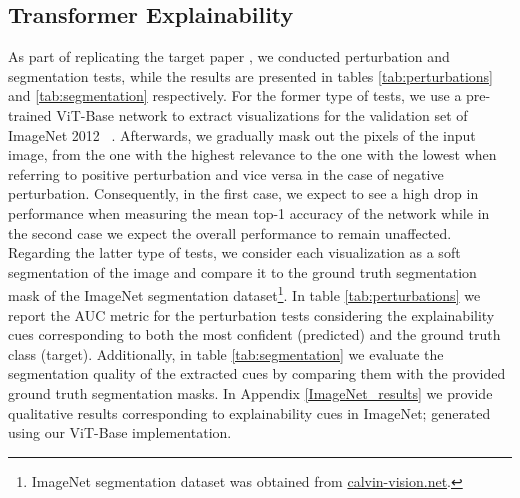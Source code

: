\subsection{Transformer Explainability}
As part of replicating the target paper \cite{mainpaper}, we conducted perturbation and segmentation tests, while the results are presented in tables \ref{tab:perturbations} and \ref{tab:segmentation} respectively. For the former type of tests, we use a pre-trained ViT-Base network to extract visualizations for the validation set of ImageNet 2012 ~\cite{russakovsky2015ImageNet}. Afterwards, we gradually mask out the pixels of the input image, from the one with the highest relevance to the one with the lowest when referring to positive perturbation and vice versa in the case of negative perturbation. Consequently, in the first case, we expect to see a high drop in performance when measuring the mean top-1 accuracy of the network while in the second case we expect the overall performance to remain unaffected. Regarding the latter type of tests, we consider each visualization as a soft segmentation of the image and compare it to the ground truth segmentation mask of the ImageNet segmentation dataset\footnote{ImageNet segmentation dataset was obtained from \href{http://calvin-vision.net/bigstuff/proj-imagenet/data/gtsegs_ijcv.mat}{calvin-vision.net}.}.  In 
table \ref{tab:perturbations} we report the AUC metric for the perturbation tests considering the explainability cues corresponding to both the most confident (predicted) and the ground truth class (target). Additionally, in table \ref{tab:segmentation} we evaluate the segmentation quality of the extracted cues by comparing them with the provided ground truth segmentation masks. In Appendix \ref{ImageNet_results} we provide qualitative results corresponding to explainability cues in ImageNet; generated using our ViT-Base implementation.


